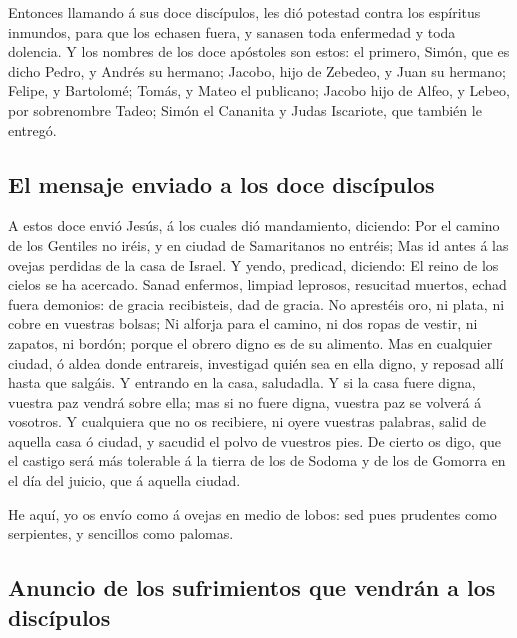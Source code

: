  Entonces llamando á sus doce discípulos, les dió potestad
contra los espíritus inmundos, para que los echasen fuera, y sanasen
toda enfermedad y toda dolencia.  Y los nombres de los doce
apóstoles son estos: el primero, Simón, que es dicho Pedro, y Andrés su
hermano; Jacobo, hijo de Zebedeo, y Juan su hermano; 
Felipe, y Bartolomé; Tomás, y Mateo el publicano; Jacobo hijo de Alfeo,
y Lebeo, por sobrenombre Tadeo;  Simón el Cananita y Judas
Iscariote, que también le entregó.

\hypertarget{el-mensaje-enviado-a-los-doce-discuxedpulos}{%
\subsection{El mensaje enviado a los doce
discípulos}\label{el-mensaje-enviado-a-los-doce-discuxedpulos}}

 A estos doce envió Jesús, á los cuales dió mandamiento,
diciendo: Por el camino de los Gentiles no iréis, y en ciudad de
Samaritanos no entréis;  Mas id antes á las ovejas perdidas
de la casa de Israel.  Y yendo, predicad, diciendo: El reino
de los cielos se ha acercado.  Sanad enfermos, limpiad
leprosos, resucitad muertos, echad fuera demonios: de gracia
recibisteis, dad de gracia.  No aprestéis oro, ni plata, ni
cobre en vuestras bolsas;  Ni alforja para el camino, ni
dos ropas de vestir, ni zapatos, ni bordón; porque el obrero digno es de
su alimento.  Mas en cualquier ciudad, ó aldea donde
entrareis, investigad quién sea en ella digno, y reposad allí hasta que
salgáis.  Y entrando en la casa, saludadla.  Y
si la casa fuere digna, vuestra paz vendrá sobre ella; mas si no fuere
digna, vuestra paz se volverá á vosotros.  Y cualquiera que
no os recibiere, ni oyere vuestras palabras, salid de aquella casa ó
ciudad, y sacudid el polvo de vuestros pies.  De cierto os
digo, que el castigo será más tolerable á la tierra de los de Sodoma y
de los de Gomorra en el día del juicio, que á aquella ciudad.

 He aquí, yo os envío como á ovejas en medio de lobos: sed
pues prudentes como serpientes, y sencillos como palomas.

\hypertarget{anuncio-de-los-sufrimientos-que-vendruxe1n-a-los-discuxedpulos}{%
\subsection{Anuncio de los sufrimientos que vendrán a los
discípulos}\label{anuncio-de-los-sufrimientos-que-vendruxe1n-a-los-discuxedpulos}}


